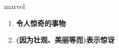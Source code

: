 
\begin{frame}
{\huge marvel}
\begin{center}
\begin{enumerate}\Large
  \item \textbf{令人惊奇的事物}
  \item \textbf{(因为壮观、美丽等而)表示惊讶}
\end{enumerate}
\end{center}
\end{frame}
